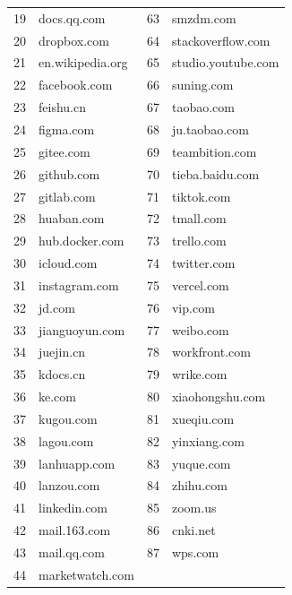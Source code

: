 \begin{table}[t]
\begin{tabular}{r l r l}
19 & docs.qq.com               & 63 & smzdm.com              \\
20 & dropbox.com               & 64 & stackoverflow.com      \\
21 & en.wikipedia.org          & 65 & studio.youtube.com     \\
22 & facebook.com              & 66 & suning.com             \\
23 & feishu.cn                 & 67 & taobao.com             \\
24 & figma.com                 & 68 & ju.taobao.com          \\
25 & gitee.com                 & 69 & teambition.com         \\
26 & github.com                & 70 & tieba.baidu.com        \\
27 & gitlab.com                & 71 & tiktok.com             \\
28 & huaban.com                & 72 & tmall.com              \\
29 & hub.docker.com            & 73 & trello.com             \\
30 & icloud.com                & 74 & twitter.com            \\
31 & instagram.com             & 75 & vercel.com             \\
32 & jd.com                    & 76 & vip.com                \\
33 & jianguoyun.com            & 77 & weibo.com              \\
34 & juejin.cn                 & 78 & workfront.com          \\
35 & kdocs.cn                  & 79 & wrike.com              \\
36 & ke.com                    & 80 & xiaohongshu.com        \\
37 & kugou.com                 & 81 & xueqiu.com             \\
38 & lagou.com                 & 82 & yinxiang.com           \\
39 & lanhuapp.com              & 83 & yuque.com              \\
40 & lanzou.com                & 84 & zhihu.com              \\
41 & linkedin.com              & 85 & zoom.us                \\
42 & mail.163.com              & 86 & cnki.net               \\
43 & mail.qq.com               & 87 & wps.com                \\
44 & marketwatch.com           &    &                        \\
\hline
\end{tabular}
\end{table}
